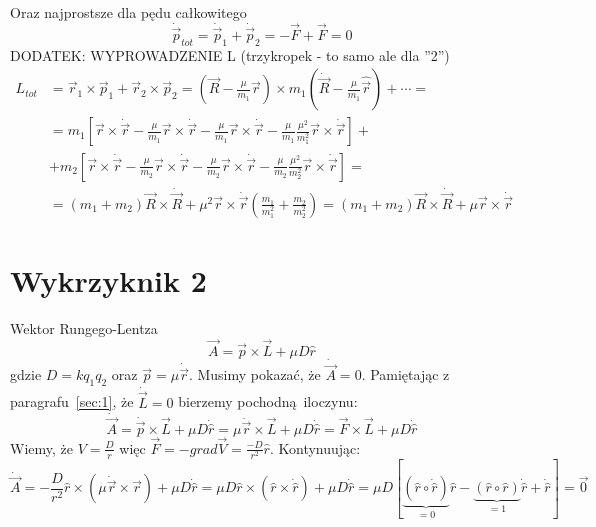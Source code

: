 \documentclass[a4paper,12pt]{article}
\begin{document}
	Oraz najprostsze dla pędu całkowitego
	$$
	\dot{\vec{p}}_{tot} = \dot{\vec{p}}_1 + \dot{\vec{p}}_2 = -\vec{F}+\vec{F} = 0
	$$
DODATEK: WYPROWADZENIE L
(trzykropek - to samo ale dla ''2'')
\begin{equation*}
  \begin{split}
    L_{tot} &= \vec{r}_1 \times \vec{p}_1 + \vec{r}_2 \times \vec{p}_2 = \left(
    \vec{R} - \frac{\mu}{m_1}\vec{r} \right) \times m_1 \left(
  \dot{\vec{R}} - \frac{\mu}{m_1} \hat{\vec{r}} \right) + \cdots = \\
  &= m_1 \left[ \vec{r} \times \dot{\vec{r}} - \frac{\mu}{m_1} \vec{r} \times
    \dot{\vec{r}} - \frac{\mu}{m_1} \vec{r} \times \dot{\vec{r}}  -
  \frac{\mu}{m_1} \frac{\mu^2}{m_1^2}\vec{r} \times \dot{\vec{r}} \right]
  + \\
  &+ m_2 \left[ \vec{r} \times \dot{\vec{r}} - \frac{\mu}{m_2} \vec{r} \times
    \dot{\vec{r}} - \frac{\mu}{m_2} \vec{r} \times \dot{\vec{r}}  -
  \frac{\mu}{m_2} \frac{\mu^2}{m_2^2}\vec{r} \times \dot{\vec{r}} \right]
  =\\ &= \left(m_1 + m_2\right) \vec{R} \times \dot{\vec{R}} + \mu^2 \vec{r}
  \times \dot{\vec{r}} \left( \frac{m_1}{m_1^2} + \frac{m_2}{m_2^2} \right) = \left(
    m_1 + m_2 \right) \vec{R} \times \dot{\vec{R}} + \mu \vec{r} \times
    \dot{\vec{r}}
  \end{split}
\end{equation*}

\section{Wykrzyknik 2}
Wektor Rungego-Lentza
\[
  \vec{A} = \vec{p} \times \vec{L} + \mu D \hat{r}
\]
gdzie $D = kq_1q_2$ oraz $\vec{p} = \mu \dot{\vec{r}}$.
Musimy pokazać, że $\dot{\vec{A}} = 0$. Pamiętając z paragrafu~\ref{sec:1}, że
$\dot{\vec{L}} = 0$ bierzemy pochodną iloczynu:
\[
  \dot{\vec{A}} = \dot{\vec{p}} \times \vec{L} + \mu D \dot{\hat{r}} = \mu
  \ddot{\vec{r}} \times \vec{L} + \mu D \dot{\hat{r}} = \vec{F} \times \vec{L} +
  \mu D \dot{\hat{r}}
\]
Wiemy, że $V = \frac{D}{r}$ więc $\vec{F} = -grad\vec{V} =
\frac{-D}{r^2}\hat{r}$. Kontynuując:
\[
  \dot{\vec{A}} = -\frac{D}{r^2}\hat{r} \times \left( \mu \dot{\vec{r}} \times
  \vec{r} \right) + \mu D \dot{\hat{r}} = \mu D\hat{r} \times \left(
  \hat{r} \times
  \dot{\hat{r}} \right) + \mu D \dot{\hat{r}} = \mu D \left[\underbrace{\left( \hat{r} \circ
    \dot{\hat{r}} \right)}_{=0} \hat{r} - \underbrace{\left( \hat{r} \circ \hat{r}
  \right)}_{=1}
\dot{\hat{r}} + \dot{\hat{r}} \right] = \vec{0}
\]
\end{document}
